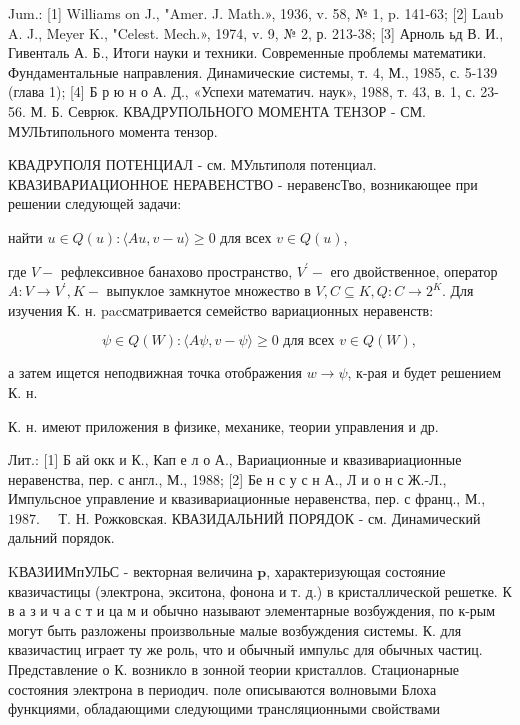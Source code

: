 \documentclass[10pt]{article}
\begin{document}
Jum.: [1] Williams on J., "Amer. J. Math.», 1936, v. 58, № 1, p. 141-63; [2] Laub A. J., Meyer K., "Celest. Mech.», 1974, v. 9, № 2, р. 213-38; [3] Арноль ьд В. И., Гивенталь А. Б., Итоги науки и техники. Современные проблемы математики. Фундаментальные направления. Динамические системы, т. 4, М., 1985, с. 5-139 (глава 1); [4] Б р ю н о А. Д., «Успехи математич. наук», 1988, т. 43, в. 1, с. 23-56. М. Б. Севрюк. КВАДРУПОЛЬНОГО МОМЕНТА ТЕНЗОР - СМ. МУЛЬтипольного момента тензор.



КВАДРУПОЛЯ ПОТЕНЦИАЛ - см. МУльтиполя потенциал. КВАЗИВАРИАЦИОННОЕ НЕРАВЕНСТВО - неравенсТво, возникающее при решении следующей задачи:



найти $u \in Q(u):\langle A u, v-u\rangle \geqslant 0$ для всех $v \in Q(u)$,



где $V-$ рефлексивное банахово пространство, $V^{\prime}-$ его двойственное, оператор $A: V \rightarrow V^{\prime}, K-$ выпуклое замкнутое множество в $V, C \subseteq K, Q: C \rightarrow 2^{K}$. Для изучения К. н. pacсматривается семейство вариационных неравенств:



\[

\psi \in Q(W):\langle A \psi, v-\psi\rangle \geqslant 0 \text { для всех } v \in Q(W),

\]



а затем ищется неподвижная точка отображения $w \rightarrow \psi$, к-рая и будет решением К. н.



К. н. имеют приложения в физике, механике, теории управления и др.



Лит.: [1] Б ай окк и К., Кап е л о А., Вариационные и квазивариационные неравенства, пер. с англ., М., 1988; [2] Бе н с у с н А., Л и о н с Ж.-Л., Импульсное управление и квазивариационные неравенства, пер. с франц., М., $1987 . \quad$ Т. Н. Рожковская. КВАЗИДАЛЬНИЙ ПОРЯДОК - см. Динамический дальний порядок.



KВАЗИИМпУЛЬС - векторная величина $\boldsymbol{p}$, характеризующая состояние квазичастицы (электрона, экситона, фонона и т. д.) в кристаллической решетке. К в а з и ч а с т и ца м и обычно называют элементарные возбуждения, по к-рым могут быть разложены произвольные малые возбуждения системы. К. для квазичастиц играет ту же роль, что и обычный импульс для обычных частиц. Представление о К. возникло в зонной теории кристаллов. Стационарные состояния электрона в периодич. поле описываются волновыми Блоха функциями, обладающими следующими трансляционными свойствами
\end{document}
